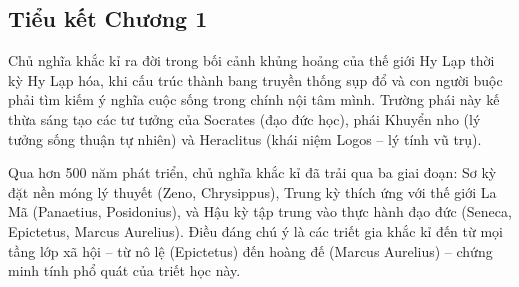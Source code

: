 \subsection*{Tiểu kết Chương 1}

Chủ nghĩa khắc kỉ ra đời trong bối cảnh khủng hoảng của thế giới Hy Lạp thời kỳ Hy Lạp hóa, khi cấu trúc thành bang truyền thống sụp đổ và con người buộc phải tìm kiếm ý nghĩa cuộc sống trong chính nội tâm mình. Trường phái này kế thừa sáng tạo các tư tưởng của Socrates (đạo đức học), phái Khuyển nho (lý tưởng sống thuận tự nhiên) và Heraclitus (khái niệm Logos – lý tính vũ trụ).

Qua hơn 500 năm phát triển, chủ nghĩa khắc kỉ đã trải qua ba giai đoạn: Sơ kỳ đặt nền móng lý thuyết (Zeno, Chrysippus), Trung kỳ thích ứng với thế giới La Mã (Panaetius, Posidonius), và Hậu kỳ tập trung vào thực hành đạo đức (Seneca, Epictetus, Marcus Aurelius). Điều đáng chú ý là các triết gia khắc kỉ đến từ mọi tầng lớp xã hội – từ nô lệ (Epictetus) đến hoàng đế (Marcus Aurelius) – chứng minh tính phổ quát của triết học này.
